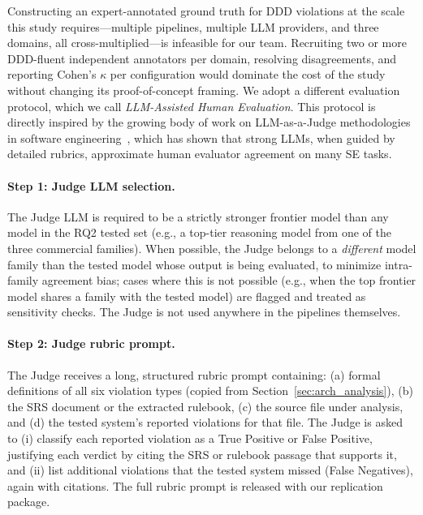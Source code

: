 \documentclass[smallextended]{svjour3}
\begin{document}
Constructing an expert-annotated ground truth for DDD violations at the scale this study requires---multiple pipelines, multiple LLM providers, and three domains, all cross-multiplied---is infeasible for our team.
Recruiting two or more DDD-fluent independent annotators per domain, resolving disagreements, and reporting Cohen's $\kappa$ per configuration would dominate the cost of the study without changing its proof-of-concept framing.
We adopt a different evaluation protocol, which we call \emph{LLM-Assisted Human Evaluation}.
This protocol is directly inspired by the growing body of work on LLM-as-a-Judge methodologies in software engineering~\cite{llmjudgeSE2025,llmjudgeSurvey2024,llmjudgesComprehensive2024}, which has shown that strong LLMs, when guided by detailed rubrics, approximate human evaluator agreement on many SE tasks.

\paragraph{Step 1: Judge LLM selection.}
The Judge LLM is required to be a strictly stronger frontier model than any model in the RQ2 tested set (e.g., a top-tier reasoning model from one of the three commercial families).
When possible, the Judge belongs to a \emph{different} model family than the tested model whose output is being evaluated, to minimize intra-family agreement bias; cases where this is not possible (e.g., when the top frontier model shares a family with the tested model) are flagged and treated as sensitivity checks.
The Judge is not used anywhere in the pipelines themselves.

\paragraph{Step 2: Judge rubric prompt.}
The Judge receives a long, structured rubric prompt containing: (a) formal definitions of all six violation types (copied from Section~\ref{sec:arch_analysis}), (b) the SRS document or the extracted rulebook, (c) the source file under analysis, and (d) the tested system's reported violations for that file.
The Judge is asked to (i) classify each reported violation as a True Positive or False Positive, justifying each verdict by citing the SRS or rulebook passage that supports it, and (ii) list additional violations that the tested system missed (False Negatives), again with citations.
The full rubric prompt is released with our replication package.
\end{document}
